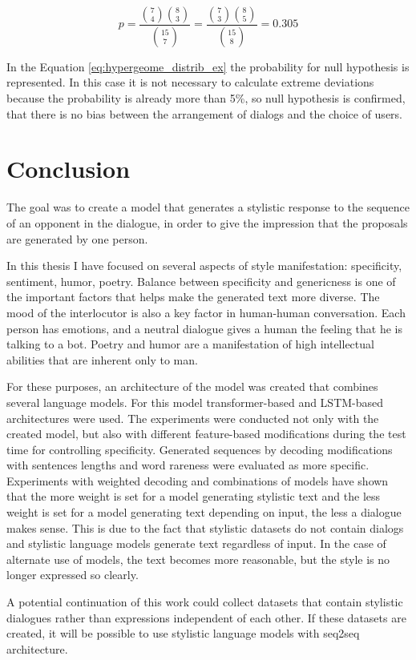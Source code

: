 \begin{equation} \label{eq:hypergeome_distrib_ex}
p = \frac{\binom{7}{4} \binom{8}{3}}{\binom{15}{7}} = \frac{\binom{7}{3} \binom{8}{5}}{\binom{15}{8}} = 0.305
\end{equation}

In the Equation \ref{eq:hypergeome_distrib_ex} the probability for null hypothesis is represented. In this case it is not necessary to calculate extreme deviations because the probability is already more than 5\%, so null hypothesis is confirmed, that there is no bias between the arrangement of dialogs and the choice of users.

\chapter{Conclusion} \label{conclusion}
The goal was to create a model that generates a stylistic response to the sequence of an opponent in the dialogue, in order to give the impression that the proposals are generated by one person.

In this thesis I have focused on several aspects of style manifestation: specificity, sentiment, humor, poetry. Balance between specificity and genericness is one of the important factors that helps make the generated text more diverse. The mood of the interlocutor is also a key factor in human-human conversation. Each person has emotions, and a neutral dialogue gives a human the feeling that he is talking to a bot. Poetry and humor are a manifestation of high intellectual abilities that are inherent only to man.

For these purposes, an architecture of the model was created that combines several language models. For this model transformer-based and LSTM-based architectures were used. The experiments were conducted not only with the created model, but also with different feature-based modifications during the test time for controlling specificity. Generated sequences by decoding modifications with sentences lengths and word rareness were evaluated as more specific. Experiments with weighted decoding and combinations of models have shown that the more weight is set for a model generating stylistic text and the less weight is set for a model generating text depending on input, the less a dialogue makes sense. This is due to the fact that stylistic datasets do not contain dialogs and stylistic language models generate text regardless of input. In the case of alternate use of models, the text becomes more reasonable, but the style is no longer expressed so clearly.


A potential continuation of this work could collect datasets that contain stylistic dialogues rather than expressions independent of each other. If these datasets are created, it will be possible to use stylistic language models with seq2seq architecture.